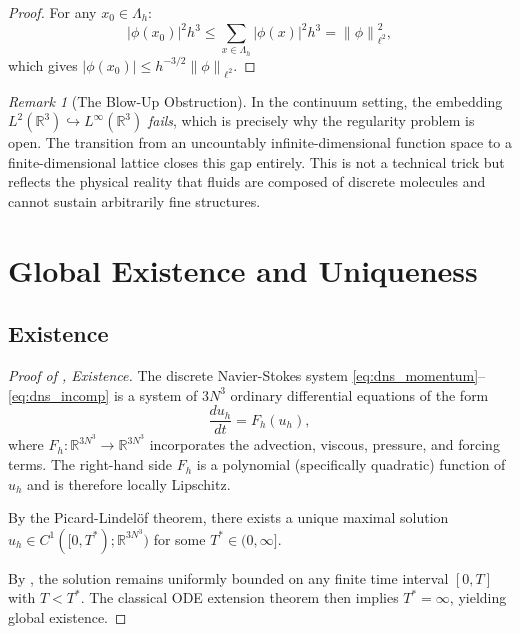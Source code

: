 \documentclass[12pt, a4paper]{article}
\theoremstyle{plain}
\theoremstyle{definition}
\theoremstyle{remark}
\newtheorem{remark}[theorem]{Remark}
\newcommand{\R}{\mathbb{R}}
\newcommand{\norm}[1]{\left\| #1 \right\|}
\newcommand{\uh}{u_h}
\begin{document}
\begin{proof}
  For any $x_0 \in \Lambda_h$:
  \begin{equation}
    |\phi(x_0)|^2 h^3 \leq \sum_{x \in \Lambda_h} |\phi(x)|^2 h^3 = \norm{\phi}_{\ell^2}^2,
  \end{equation}
  which gives $|\phi(x_0)| \leq h^{-3/2}\norm{\phi}_{\ell^2}$.
\end{proof}

\begin{remark}[The Blow-Up Obstruction]\label{rem:blowup}
  In the continuum setting, the embedding $L^2(\R^3) \hookrightarrow L^\infty(\R^3)$
  \emph{fails}, which is precisely why the regularity problem is open. The
  transition from an uncountably infinite-dimensional function space to a
  finite-dimensional lattice closes this gap entirely. This is not a technical
  trick but reflects the physical reality that fluids are composed of discrete
  molecules and cannot sustain arbitrarily fine structures.
\end{remark}

\section{Global Existence and Uniqueness}\label{sec:existence}

\subsection{Existence}

\begin{proof}[Proof of , Existence]
  The discrete Navier-Stokes system \eqref{eq:dns_momentum}--\eqref{eq:dns_incomp}
  is a system of $3N^3$ ordinary differential equations of the form
  \begin{equation}
    \frac{d\uh}{dt} = F_h(\uh),
  \end{equation}
  where $F_h: \R^{3N^3} \to \R^{3N^3}$ incorporates the advection, viscous,
  pressure, and forcing terms. The right-hand side $F_h$ is a polynomial
  (specifically quadratic) function of $\uh$ and is therefore locally Lipschitz.

  By the Picard-Lindel\"of theorem, there exists a unique maximal solution
  $\uh \in C^1([0, T^*); \R^{3N^3})$ for some $T^* \in (0, \infty]$.

  By , the solution remains uniformly bounded on any
  finite time interval $[0,T]$ with $T < T^*$. The classical ODE extension
  theorem then implies $T^* = \infty$, yielding global existence.
\end{proof}
\end{document}
